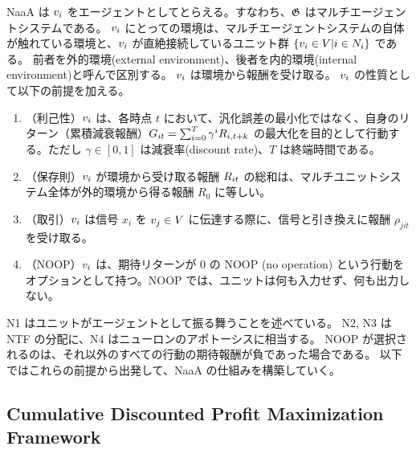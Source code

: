 NaaA は $v_{i}$ をエージェントとしてとらえる。すなわち、$\mathfrak{G}$ はマルチエージェントシステムである。
$v_{i}$ にとっての環境は、マルチエージェントシステムの自体が触れている環境と、$v_{i}$ が直絶接続しているユニット群 $\{v_i \in V | i \in N_i\}$ である。
前者を外的環境(external environment)、後者を内的環境(internal environment)と呼んで区別する。
$v_{i}$ は環境から報酬を受け取る。
$v_{i}$ の性質として以下の前提を加える。
\begin{enumerate}
\renewcommand{\labelenumi}{N\arabic{enumi}:}
\item （利己性）$v_{i}$ は、各時点 $t$ において、汎化誤差の最小化ではなく、自身のリターン（累積減衰報酬）$G_{it} = \sum_{i=0}^T \gamma^i R_{i,t+k} $ の最大化を目的として行動する。ただし $\gamma \in [0, 1]$ は減衰率(discount rate)、$T$ は終端時間である。
\item （保存則）$v_{i}$ が環境から受け取る報酬 $R_{it}$ の総和は、マルチユニットシステム全体が外的環境から得る報酬 $R_0$ に等しい。
\item （取引）$v_{i}$ は信号 $x_i$ を $v_{j} \in V$ に伝達する際に、信号と引き換えに報酬 $\rho_{jit}$ を受け取る。
\item （NOOP）$v_{i}$ は、期待リターンが 0 の NOOP (no operation) という行動をオプションとして持つ。NOOP では、ユニットは何も入力せず、何も出力しない。
\end{enumerate}
N1 はユニットがエージェントとして振る舞うことを述べている。
N2, N3 は NTF の分配に、N4 はニューロンのアポトーシスに相当する。
NOOP が選択されるのは、それ以外のすべての行動の期待報酬が負であった場合である。
以下ではこれらの前提から出発して、NaaA の仕組みを構築していく。

\subsection{Cumulative Discounted Profit Maximization Framework}
%

